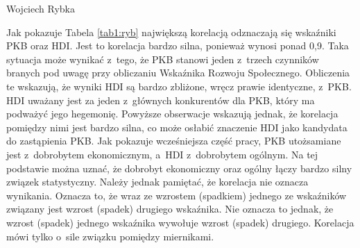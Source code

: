 \begin{artplenv}{Wojciech Rybka}
\begin{table}[H]
	\caption{Zależność pomiędzy danymi otrzymanymi ze wskaźników.
	Źródło: obliczenia własne na podstawie
	\parencite{international_monetary_fund_world_2019a,united_nations_development_programme_human_2019,noauthor_world_2018}.
	}
	\label{tab1:ryb}
\end{table}


%

Jak pokazuje Tabela \ref{tab1:ryb} największą korelacją odznaczają się wskaźniki PKB oraz HDI. Jest to korelacja bardzo silna,
ponieważ wynosi ponad 0,9. Taka sytuacja może wynikać z~tego, że PKB stanowi jeden z~trzech czynników branych pod uwagę
przy obliczaniu Wskaźnika Rozwoju Społecznego. Obliczenia te wskazują, że wyniki HDI są bardzo zbliżone, wręcz prawie
identyczne, z~PKB. HDI uważany jest za jeden z~głównych konkurentów dla PKB, który ma podważyć jego hegemonię. Powyższe
obserwacje wskazują jednak, że korelacja pomiędzy nimi jest bardzo silna, co może osłabić znaczenie HDI jako
kandydata do zastąpienia PKB. Jak pokazuje wcześniejsza część pracy, PKB utożsamiane jest z~dobrobytem ekonomicznym,
a~HDI z~dobrobytem ogólnym. Na tej podstawie można uznać, że dobrobyt ekonomiczny oraz ogólny łączy bardzo silny związek
statystyczny. Należy jednak pamiętać, że korelacja nie oznacza wynikania. Oznacza to, że wraz ze wzrostem (spadkiem)
jednego ze wskaźników związany jest wzrost (spadek) drugiego wskaźnika. Nie oznacza to jednak, że wzrost (spadek)
jednego wskaźnika wywołuje wzrost (spadek) drugiego. Korelacja mówi tylko o~sile związku pomiędzy miernikami. 


\end{artplenv}
